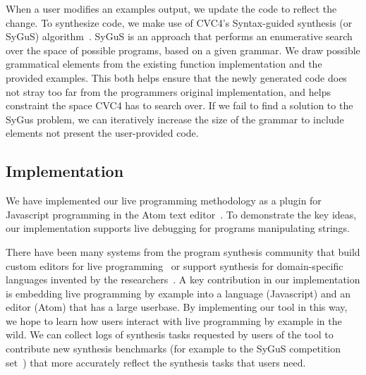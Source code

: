 When a user modifies an examples output, we update the code to reflect the change.
To synthesize code, we make use of CVC4's Syntax-guided synthesis (or SyGuS) algorithm~\cite{reynolds2017sygus}.
SyGuS is an approach that performs an enumerative search over the space of possible programs,
based on a given grammar.
We draw possible grammatical elements from the existing function implementation and the provided examples.
This both helps ensure that the newly generated code does not stray too far from the programmers original implementation,
and helps constraint the space CVC4 has to search over.
If we fail to find a solution to the SyGus problem, we can iteratively increase the size of the grammar to include elements not present the user-provided code.

\subsection{Implementation}
We have implemented our live programming methodology as a plugin
for Javascript programming in the Atom text editor~\cite{Atom}.
To demonstrate the key ideas, our implementation supports live debugging for programs manipulating strings.

There have been many systems from the program synthesis community that build custom editors for live programming~\cite{Mayer} or support synthesis for domain-specific languages invented by the researchers~\cite{omar2018live}.
A key contribution in our implementation is embedding live programming by example into a language (Javascript) and an editor (Atom) that has a large userbase.
By implementing our tool in this way, we hope to learn how users interact with live programming by example in the wild.
We can collect logs of synthesis tasks requested by users of the tool to contribute new synthesis benchmarks (for example to the SyGuS competition set~\cite{alur2017sygus}) that more accurately reflect the synthesis tasks that users need.

